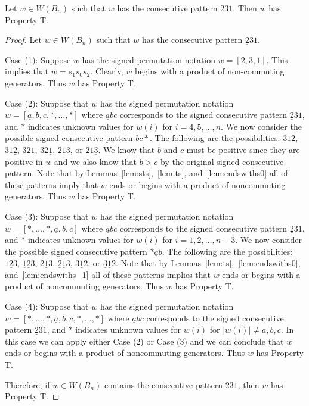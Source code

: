\begin{lemma}\label{lem:231}
Let $w \in W(B_n)$ such that $w$ has the consecutive pattern $\underline{2}31$. Then $w$ has Property T.
\begin{proof}
	Let $w \in W(B_n)$ such that $w$ has the consecutive pattern $\underline{2}31$.
	
	Case (1): Suppose $w$ has the signed permutation notation $w=[\underline{2},3,1]$. This implies that $w=s_1s_0s_2$. Clearly, $w$ begins with a product of non-commuting generators. Thus $w$ has Property T.
	
	Case (2): Suppose that $w$ has the signed permutation notation $w=[\underline{a},b,c, \ast, \ldots, \ast]$ where $\underline{a}bc$ corresponds to the signed consecutive pattern $\underline{2}31$, and $\ast$ indicates unknown values for $w(i)$ for $i=4,5, \ldots, n$. We now consider the possible signed consecutive pattern $bc \ast$. The following are the possibilities: $312$, $31\underline{2}$, $321$, $32\underline{1}$, $213$, or $21\underline{3}$. We know that $b$ and $c$ must be positive since they are positive in $w$ and we also know that $b>c$ by the original signed consecutive pattern. Note that by Lemmas~\ref{lem:sts},~\ref{lem:ts}, and~\ref{lem:endswiths0} all of these patterns imply that $w$ ends or begins with a product of noncommuting generators. Thus $w$ has Property T.
	
	Case (3): Suppose that $w$ has the signed permutation notation $w=[\ast, \ldots, \ast, \underline{a},b,c]$ where $\underline{a}bc$ corresponds to the signed consecutive pattern $\underline{2}31$, and $\ast$ indicates unknown values for $w(i)$ for $i=1,2, \ldots ,n-3$. We now consider the possible signed consecutive pattern $\ast \underline{a}b$. The following are the possibilities: $1 \underline{2} 3$, $\underline{1} \underline{2}3$, $2 \underline{1} 3$, $\underline{2} \underline{1} 3$, $3 \underline{1} 2$, or $\underline{3} \underline{1} 2$. Note that by Lemmas~\ref{lem:ts},~\ref{lem:endswiths0}, and~\ref{lem:endswiths_1} all of these patterns implies that $w$ ends or begins with a product of noncommuting generators. Thus $w$ has Property T. 
	
	Case (4): Suppose that $w$ has the signed permutation notation $w=[\ast, \ldots, \ast, \underline{a},b,c, \ast, \ldots, \ast]$ where $\underline{a}bc$ corresponds to the signed consecutive pattern $\underline{2}31$, and $\ast$ indicates unknown values for $w(i)$ for $|w(i)|\neq a,b,c$. In this case we can apply either Case (2) or Case (3) and we can conclude that $w$ ends or begins with a product of noncommuting generators. Thus $w$ has Property T.

	Therefore, if $w \in W(B_n)$ contains the consecutive pattern $\underline{2}31$, then $w$ has Property T.
\end{proof}	
\end{lemma}

